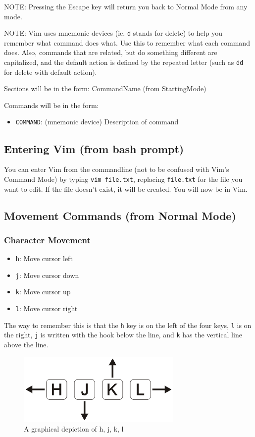 \documentclass[11pt]{article}
\begin{document}
NOTE: Pressing the Escape key will return you back to Normal Mode from any mode.

NOTE: Vim uses mnemonic devices (ie. \texttt{d} stands for delete) to help you remember
what command does what. Use this to remember what each command does. Also,
commands that are related, but do something different are capitalized, and the
default action is defined by the repeated letter (such as \texttt{dd} for delete with
default action).

Sections will be in the form: CommandName (from StartingMode)

Commands will be in the form:
\begin{itemize}
\item \texttt{COMMAND}: (mnemonic device) Description of command
\end{itemize}
\subsection{Entering Vim (from bash prompt)}
\label{sec:orgf83640d}
You can enter Vim from the commandline (not to be confused with Vim's Command
Mode) by typing \texttt{vim file.txt}, replacing \texttt{file.txt} for the file you want to
edit. If the file doesn't exist, it will be created. You will now be in Vim.
\subsection{Movement Commands (from Normal Mode)}
\label{sec:org5e6eaac}
\subsubsection{Character Movement}
\label{sec:orgb21eb39}
\begin{itemize}
\item \texttt{h}: Move cursor left
\item \texttt{j}: Move cursor down
\item \texttt{k}: Move cursor up
\item \texttt{l}: Move cursor right
\end{itemize}

The way to remember this is that the \texttt{h} key is on the left of the four keys,
\texttt{l} is on the right, \texttt{j} is written with the hook below the line, and \texttt{k} has
the vertical line above the line.

\begin{figure}[htbp]
\centering
\includegraphics[width=.9\linewidth]{./hjkl.png}
\caption{\label{fig:orge9c37bd}
A graphical depiction of h, j, k, l}
\end{figure}
\end{document}
